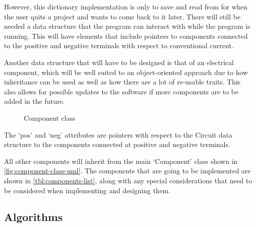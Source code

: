         However, this dictionary implementation is only to save and read from for when the user quits a project and wants to come back to it later. 
        There will still be needed a data structure that the program can interact with while the program is running. 
        This will have elements that include pointers to components connected to the positive and negative terminals with respect to conventional current. 

        Another data structure that will have to be designed is that of an electrical component, which will be well suited to an object-oriented approach due to how inheritance can be used as well as how there are a lot of re-usable traits. 
        This also allows for possible updates to the software if more components are to be added in the future.

        \begin{figure}[!ht]
            \centering
            \caption{Component class}
            \label{fig:component-class-uml}
        \end{figure}

        The `pos' and `neg' attributes are pointers with respect to the Circuit data structure to the components connected at positive and negative terminals. 

        All other components will inherit from the main `Component' class shown in \autoref{fig:component-class-uml}. 
        The components that are going to be implemented are shown in \autoref{tbl:components-list}, along with any special considerations that need to be considered when implementing and designing them. 


    \subsection{Algorithms}

